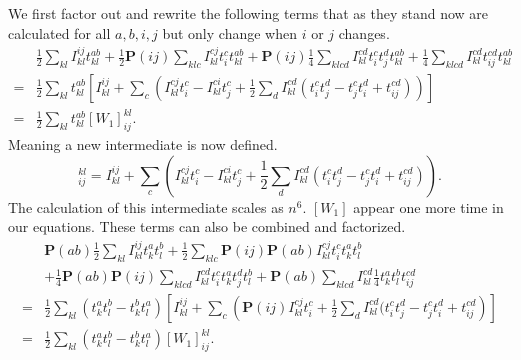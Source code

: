 \documentclass[graybox,sectrefs,envcountresetchap,open=right]{svmonodo}
\begin{document}
We first factor out and rewrite the following terms that as they stand now are calculated for all $a,b,i,j$ but only change when $i$ or $j$ changes.
\begin{align}
& 
\frac{1}{2} \sum_{kl} I_{kl}^{ij} t_{kl}^{ab} + \frac{1}{2} \mathbf{P}(ij) \sum_{klc} I_{kl}^{cj} t_i^c t_{kl}^{ab} + \mathbf{P}(ij) \frac{1}{4} \sum_{klcd} I_{kl}^{cd}  t_i^c t_j^d t_{kl}^{ab}
+ \frac{1}{4} \sum_{klcd} I_{kl}^{cd} t_{ij}^{cd} t_{kl}^{ab}
\nonumber \\ 
= &
\frac{1}{2} \sum_{kl} t_{kl}^{ab} \left[ I_{kl}^{ij} +  \sum_c \left(I_{kl}^{cj} t_i^c - I_{kl}^{ci} t_j^c + \frac{1}{2} \sum_{d}  I_{kl}^{cd} (t_i^c t_j^d - t_j^c t_i^d + t_{ij}^{cd})
 \right) \right]
\nonumber \\ 
= & \frac{1}{2} \sum_{kl} t_{kl}^{ab} [W_1]_{ij}^{kl} 
.
\end{align}
Meaning a new intermediate is now defined.
\begin{equation}
[W_1]^{kl}_{ij} = I_{kl}^{ij} +  \sum_c \left(I_{kl}^{cj} t_i^c - I_{kl}^{ci} t_j^c + \frac{1}{2} \sum_{d}  I_{kl}^{cd} (t_i^c t_j^d - t_j^c t_i^d + t_{ij}^{cd})
 \right) . \label{intermedw1}
\end{equation}
The calculation of this intermediate scales as $n^6$. $[W_1]$ appear one more time in our equations. These terms can also be combined and factorized.
\begin{align}
& \mathbf{P}(ab) \frac{1}{2} \sum_{kl} I_{kl}^{ij} t_k^a t_l^b
+ \frac{1}{2} \sum_{klc} \mathbf{P}(ij) \mathbf{P}(ab) I_{kl}^{cj} t_i^c t_k^a t_l^b 
\nonumber \\ &
+ \frac{1}{4} \mathbf{P}(ab) \mathbf{P}(ij) \sum_{klcd} I_{kl}^{cd} t_i^c t_k^a t_j^d t_l^b
+ \mathbf{P}(ab) \sum_{klcd} I_{kl}^{cd} \frac{1}{4} t_k^a t_l^b t_{ij}^{cd}
\nonumber \\ 
= &
\frac{1}{2} \sum_{kl} (t_k^a t_l^b - t_k^b t_l^a) \left[ I_{kl}^{ij} + \sum_c \left( \mathbf{P}(ij) I_{kl}^{cj} t_i^c +
\frac{1}{2} \sum_d I_{kl}^{cd} ( t_i^c t_j^d - t_j^c t_i^d + t_{ij}^{cd}
\right) \right] \nonumber \\ 
= &
\frac{1}{2} \sum_{kl} (t_k^a t_l^b - t_k^b t_l^a) [W_1]_{ij}^{kl} .
\end{align}
\end{document}
